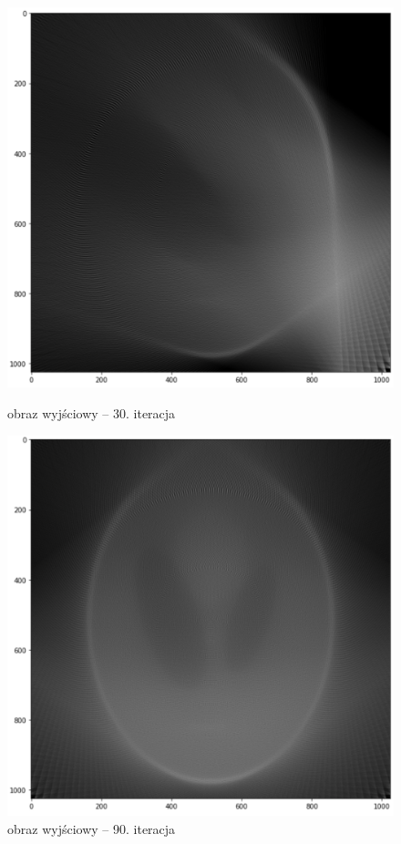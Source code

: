 \documentclass[polish,polish,a4paper]{article}
\begin{document}
					\begin{figure}[!h]
						\centering
						\begin{minipage}{0.45\linewidth}
							\includegraphics[width=\linewidth]{img/out_30.png}
							\caption{obraz wyjściowy -- 30. iteracja}
						\end{minipage}
						\hfill
						\begin{minipage}{0.45\linewidth}
							\includegraphics[width=\linewidth]{img/out_90.png}
							\caption{obraz wyjściowy -- 90. iteracja}
						\end{minipage}
					\end{figure} 
				
\end{document}
